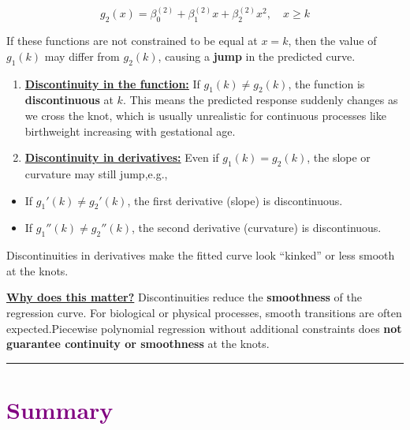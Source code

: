 \documentclass[
  letterpaper,
  DIV=11,
  numbers=noendperiod]{scrreprt}
\providecommand{\tightlist}{%
  \setlength{\itemsep}{0pt}\setlength{\parskip}{0pt}}\usepackage{longtable,booktabs,array}
\begin{document}
\[
g_2(x) = \beta_0^{(2)} + \beta_1^{(2)} x + \beta_2^{(2)} x^2, \quad x \geq k
\]

If these functions are not constrained to be equal at \(x = k\), then
the value of \(g_1(k)\) may differ from \(g_2(k)\), causing a
\textbf{jump} in the predicted curve.

\begin{enumerate}
\def\labelenumi{\arabic{enumi}.}
\tightlist
\item
  \ul{\textbf{Discontinuity in the function:}} If
  \(g_1(k) \neq g_2(k)\), the function is \textbf{discontinuous} at
  \(k\). This means the predicted response suddenly changes as we cross
  the knot, which is usually unrealistic for continuous processes like
  birthweight increasing with gestational age.
\item
  \ul{\textbf{Discontinuity in derivatives:}} Even if
  \(g_1(k) = g_2(k)\), the slope or curvature may still jump,e.g.,
\end{enumerate}

\begin{itemize}
\item
  If \(g_1'(k) \neq g_2'(k)\), the first derivative (slope) is
  discontinuous.
\item
  If \(g_1''(k) \neq g_2''(k)\), the second derivative (curvature) is
  discontinuous.
\end{itemize}

Discontinuities in derivatives make the fitted curve look ``kinked'' or
less smooth at the knots.

\ul{\textbf{Why does this matter?}} Discontinuities reduce the
\textbf{smoothness} of the regression curve. For biological or physical
processes, smooth transitions are often expected.Piecewise polynomial
regression without additional constraints does \textbf{not guarantee
continuity or smoothness} at the knots.

\begin{center}\rule{0.5\linewidth}{0.5pt}\end{center}

\hypertarget{section-22}{%
\section*{\texorpdfstring{\textcolor{purple}{Summary}}{}}\label{section-22}}

\markright{\textcolor{purple}{Summary}}
\end{document}
